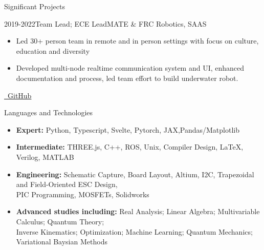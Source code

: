 \documentclass[]{mcdowellcv}
\begin{document}
\begin{cvsection}{Significant Projects}
\begin{cvsubsection}{2019-2022}{Team Lead; ECE Lead}{MATE \& FRC Robotics, SAAS}
\begin{itemize}
			\item Led 30+ person team in remote and in person settings with focus on culture, education and diversity
			\item Developed multi-node realtime communication system and UI, enhanced documentation and process, led team effort to build underwater robot.
		\end{itemize}
		\href{https://github.com/redshiftrobotics/}{\faGithub \ GitHub}
	\end{cvsubsection}
\end{cvsection}

\begin{cvsection}{Languages and Technologies}
	\begin{cvsubsection}{}{}{}
		\begin{itemize}
			\item \textbf{Expert:} Python, Typescript, Svelte, Pytorch, JAX,Pandas/Matplotlib
			\item \textbf{Intermediate:} THREE.js, C++, ROS, Unix, Compiler Design, LaTeX, Verilog, MATLAB
			\item \textbf{Engineering:} Schematic Capture, Board Layout, Altium, I2C,
			      Trapezoidal and Field-Oriented ESC Design, \\ PIC Programming, MOSFETs, Solidworks
			\item \textbf{Advanced studies including:} Real Analysis; Linear Algebra; Multivariable Calculus; Quantum Theory; \\ Inverse Kinematics; Optimization; Machine Learning; Quantum Mechanics; Variational Baysian Methods
		\end{itemize}
	\end{cvsubsection}
\end{cvsection}
\end{document}
